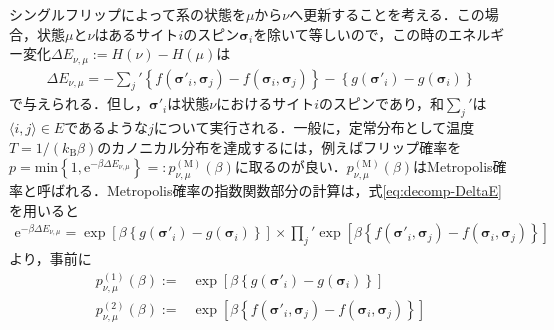 \documentclass[a4,10pt, platex, dvipdfmx]{jsarticle}
\newcommand{\pair}[2]{\langle #1, #2 \rangle}
\newcommand{\spin}{\bm{\sigma}}
\begin{document}
    シングルフリップによって系の状態を$\mu$から$\nu$へ更新することを考える．この場合，状態$\mu$と$\nu$はあるサイト$i$のスピン$\spin_{i}$を除いて等しいので，この時のエネルギー変化$\Delta E_{\nu, \mu} := H\left(\nu\right) - H\left(\mu\right)$は
    \begin{align}
        \Delta E_{\nu, \mu} = - {\sum_{j}}' \left\{f\left(\spin'_{i}, \spin_{j}\right) - f\left(\spin_{i}, \spin_{j}\right)\right\} - \left\{g\left(\spin'_{i}\right) - g\left(\spin_{i}\right)\right\} \label{eq:decomp-DeltaE}
    \end{align}
    で与えられる．但し，$\spin'_{i}$は状態$\nu$におけるサイト$i$のスピンであり，和${\sum_{j}}'$は$\pair{i}{j} \in E$であるような$j$について実行される．一般に，定常分布として温度$T=1/(k_{\mathrm{B}}\beta)$のカノニカル分布を達成するには，例えばフリップ確率を$p = \mathrm{min}\left\{1, \mathrm{e}^{-\beta \Delta E_{\nu, \mu}}\right\}=:p^{\mathrm{(M)}}_{\nu, \mu} (\beta) $に取るのが良い．$ p^{\mathrm{(M)}}_{\nu, \mu} (\beta) $はMetropolis確率と呼ばれる．Metropolis確率の指数関数部分の計算は，式\eqref{eq:decomp-DeltaE}を用いると
    \begin{align}
        \mathrm{e}^{-\beta \Delta E_{\nu, \mu}} = \exp\left[ \beta \left\{g\left(\spin'_{i}\right) - g\left(\spin_{i}\right)\right\} \right] \times {\prod_{j}}' \exp\left[ \beta \left\{f\left(\spin'_{i}, \spin_{j}\right) - f\left(\spin_{i}, \spin_{j}\right)\right\} \right]
    \end{align}
    より，事前に
    \begin{align}
        p^{(1)}_{\nu,\mu}(\beta) := & \exp\left[ \beta \left\{g\left(\spin'_{i}\right) - g\left(\spin_{i}\right)\right\} \right] \\
        p^{(2)}_{\nu,\mu}(\beta) := & \exp\left[ \beta \left\{f\left(\spin'_{i}, \spin_{j}\right) - f\left(\spin_{i}, \spin_{j}\right)\right\} \right]
    \end{align}
\end{document}
